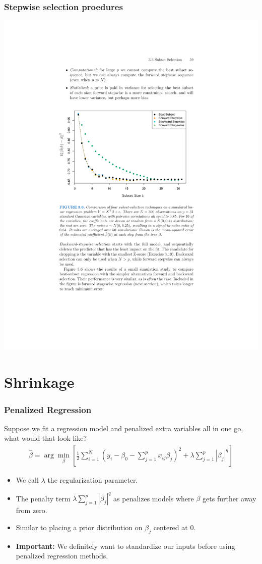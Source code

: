 \begin{frame}
\frametitle{Stepwise selection proedures}
\begin{center}
\includegraphics[height=0.85\textheight]{./resources/subsetstepwise}
\end{center}
\end{frame}

\section{Shrinkage}

\begin{frame}
\frametitle{Penalized Regression}
Suppose we fit a regression model and penalized extra variables all in one go, what would that look like?
\begin{eqnarray*}
\hat{\beta} = \arg \min_{\beta} \left[\frac{1}{2} \sum_{i=1}^N (y_i - \beta_0 - \sum_{j=1}^p x_{ij} \beta_j)^2 + \lambda \sum_{j=1}^p | \beta_j|^{q} \right]
\end{eqnarray*}
\begin{itemize}
    \item We call $\lambda$ the \alert{regularization} parameter.
    \item The penalty term $\lambda \sum_{j=1}^p | \beta_j|^{q}$ as penalizes models where $\beta$ gets further away from zero.
    \item Similar to placing a \alert{prior distribution} on $\beta_j$ centered at 0.
    \item \textbf{Important:} We definitely want to \alert{standardize} our inputs before using penalized regression methods.
\end{itemize}
\end{frame}

